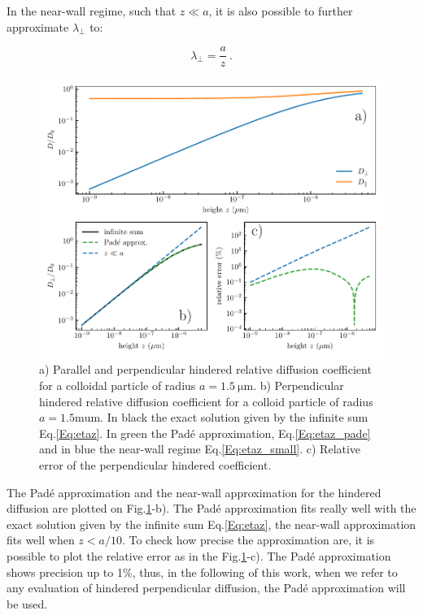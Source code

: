 In the near-wall regime, such that $z \ll a$, it is also possible to further approximate $\lambda_\bot$ to:

\begin{equation}
	\lambda_\bot = \frac{a}{z} ~.
	\label{Eq:etaz_small}
\end{equation}


\begin{figure}[H]
	\centering
	\includegraphics{02_body/chapter3/images/theory_lambda/hindered_diffusion.pdf}
	\caption{a)  Parallel and perpendicular hindered relative diffusion coefficient for a colloidal particle of radius $a = 1.5 ~ \mathrm{\mu m}$. b) Perpendicular hindered relative diffusion coefficient for a colloid particle of radius $a = 1.5 \mathrm{mu m}$. In black the exact solution given by the infinite sum Eq.\ref{Eq:etaz}. In green the Padé approximation, Eq.\ref{Eq:etaz_pade} and in blue the near-wall regime Eq.\ref{Eq:etaz_small}. c) Relative error of the perpendicular hindered coefficient.}
	\label{fig.etaz}
\end{figure}


The Padé approximation and the near-wall approximation for the hindered diffusion are plotted on Fig.\ref{fig.etaz}-b). The Padé approximation fits really well with the exact solution given by the infinite sum Eq.\ref{Eq:etaz}, the near-wall approximation fits well when $z < a / 10$. To check how precise the approximation are, it is possible to plot the relative error as in the Fig.\ref{fig.etaz}-c). The Padé approximation shows precision up to 1\%, thus, in the following of this work, when we refer to any evaluation of hindered perpendicular diffusion, the Padé approximation will be used. 


